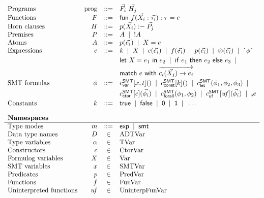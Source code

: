 \documentclass[acmsmall,screen,nonacm]{acmart}
\newcommand{\BNFALT}{\;\;|\;\;}
\theoremstyle{definition}
\begin{document}
\begin{figure}[t]
\[\begin{array}{lrcl}
    \text{Programs}     & \prog &::=& \vec{F_i} ~ \vec{H_j} \\
    \text{Functions}    & F     &::=& \fun{f}{\vec{X_i} : \vec{\tau_i}}{\tau}{e} \\
    \text{Horn clauses} & H     &::=& p(\vec{X_i}) \horn \vec{P_j} \\
    \text{Premises}     & P     &::=& A \BNFALT \mathord{!}A \\
    \text{Atoms}        & A     &::=& p(\vec{e_i}) \BNFALT X=e \\
    \text{Expressions}  & e     &::=& k \BNFALT
                                      X \BNFALT
                                      c(\vec{e_i}) \BNFALT
                                      f(\vec{e_i}) \BNFALT
                                      p(\vec{e_i}) \BNFALT
                                      \operation{\vec{e_i}} \BNFALT
                                      \qq{\phi}
                                      \\[0.25em] &&&
                                      \letin{X}{e_1}{e_2} \BNFALT
                                      \ite{e_1}{e_2}{e_3} \BNFALT
                                      \\[0.25em] &&&
                                      \match{e}{\overrightarrow{c_i(\vec{X_j}) \rightarrow e_i}}
                                      \\[0.25em]
    \text{SMT formulas} & \phi  &::=& \cVAR[x,t]() \BNFALT
                                      \cCONST[k]() \BNFALT
                                      \cLET(\phi_1, \phi_2, \phi_3) \BNFALT
                                      \\[0.25em] &&&
                                      \cCTOR[c](\vec{\phi_i}) \BNFALT
                                      \cFORALL(\phi_1, \phi_2) \BNFALT
                                      \cUF[\uf](\vec{\phi_i}) \BNFALT
                                      \unq{e} \\[0.25em]
    \text{Constants}    & k     &::=& \mathsf{true} \BNFALT \mathsf{false} \BNFALT \mathsf{0} \BNFALT \mathsf{1} \BNFALT \dots \\[1em]

    \multicolumn{4}{l}{\textbf{Namespaces}} \\ \hline
    \text{Type modes} & m &::=& \mEXP \BNFALT \mSMT \\
    \text{Data type names} & D &\in& \mathrm{ADTVar} \\
    \text{Type variables} & \alpha &\in& \mathrm{TVar} \\
    \text{Constructors} & c     &\in& \mathrm{CtorVar} \\
    \text{\Name variables} & X &\in& \mathrm{Var} \\
    \text{SMT variables} & x &\in& \mathrm{SMTVar} \\
    \text{Predicates} & p &\in& \mathrm{PredVar} \\
    \text{Functions} & f &\in& \mathrm{FunVar} \\
    \text{Uninterpreted functions} & \uf &\in& \mathrm{UninterpFunVar} \\
    

\end{array}\]
\end{figure}
\end{document}

